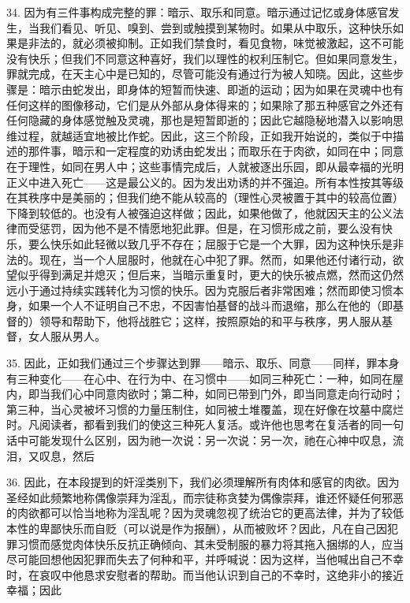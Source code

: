 34. 因为有三件事构成完整的罪：暗示、取乐和同意。暗示通过记忆或身体感官发生，当我们看见、听见、嗅到、尝到或触摸到某物时。如果从中取乐，这种快乐如果是非法的，就必须被抑制。正如我们禁食时，看见食物，味觉被激起，这不可能没有快乐；但我们不同意这种喜好，我们以理性的权利压制它。但如果同意发生，罪就完成，在天主心中是已知的，尽管可能没有通过行为被人知晓。因此，这些步骤是：暗示由蛇发出，即身体的短暂而快速、即逝的运动；因为如果在灵魂中也有任何这样的图像移动，它们是从外部从身体得来的；如果除了那五种感官之外还有任何隐藏的身体感觉触及灵魂，那也是短暂即逝的；因此它越隐秘地潜入以影响思维过程，就越适宜地被比作蛇。因此，这三个阶段，正如我开始说的，类似于中描述的那件事，暗示和一定程度的劝诱由蛇发出；而取乐在于肉欲，如同在中；同意在于理性，如同在男人中；这些事情完成后，人就被逐出乐园，即从最幸福的光明正义中进入死亡——这是最公义的。因为发出劝诱的并不强迫。所有本性按其等级在其秩序中是美丽的；但我们绝不能从较高的（理性心灵被置于其中的较高位置）下降到较低的。也没有人被强迫这样做；因此，如果他做了，他就因天主的公义法律而受惩罚，因为他不是不情愿地犯此罪。但是，在习惯形成之前，要么没有快乐，要么快乐如此轻微以致几乎不存在；屈服于它是一个大罪，因为这种快乐是非法的。现在，当一个人屈服时，他就在心中犯了罪。然而，如果他还付诸行动，欲望似乎得到满足并熄灭；但后来，当暗示重复时，更大的快乐被点燃，然而这仍然远小于通过持续实践转化为习惯的快乐。因为克服后者非常困难；然而即使习惯本身，如果一个人不证明自己不忠，不因害怕基督的战斗而退缩，那么在他的（即基督的）领导和帮助下，他将战胜它；这样，按照原始的和平与秩序，男人服从基督，女人服从男人。\par

35. 因此，正如我们通过三个步骤达到罪——暗示、取乐、同意——同样，罪本身有三种变化——在心中、在行为中、在习惯中——如同三种死亡：一种，如同在屋内，即当我们心中同意肉欲时；第二种，如同已带到门外，即当同意走向行动时；第三种，当心灵被坏习惯的力量压制住，如同被土堆覆盖，现在好像在坟墓中腐烂时。凡阅读者，都看到我们的使这三种死人复活。或许他也思考在复活者的同一句话中可能发现什么区别，因为祂一次说：另一次说：另一次，祂在心神中叹息，流泪，又叹息，然后\par

36. 因此，在本段提到的奸淫类别下，我们必须理解所有肉体和感官的肉欲。因为圣经如此频繁地称偶像崇拜为淫乱，而宗徒称贪婪为偶像崇拜，谁还怀疑任何邪恶的肉欲都可以恰当地称为淫乱呢？因为灵魂忽视了统治它的更高法律，并为了较低本性的卑鄙快乐而自贬（可以说是作为报酬），从而被败坏？因此，凡在自己因犯罪习惯而感觉肉体快乐反抗正确倾向、其未受制服的暴力将其拖入捆绑的人，应当尽可能回想他因犯罪而失去了何种和平，并呼喊说：因为这样，当他喊出自己不幸时，在哀叹中他恳求安慰者的帮助。而当他认识到自己的不幸时，这绝非小的接近幸福；因此\par

